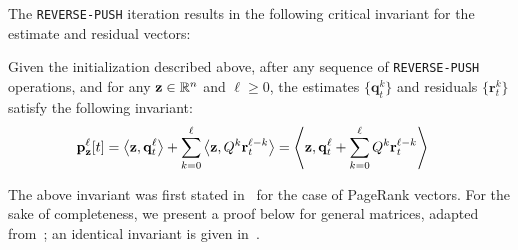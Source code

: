 The \texttt{REVERSE-PUSH} iteration results in the following critical invariant for the estimate and residual vectors:
\begin{lemma}
\label{lem:pushinvariant}
Given the initialization described above, after any sequence of \texttt{REVERSE-PUSH} operations, and for any $\mathbf{z}\in\mathbb{R}^n$ and $\ell\geq 0$, the estimates $\{\mathbf{q}_t^k\}$ and residuals $\{\mathbf{r}_t^k\}$  satisfy the following invariant:
\begin{align*}
\mathbf{p}_{\mathbf{z}}^{\ell}[t] &= \left< \mathbf{z}, \mathbf{q}_t^{\ell} \right> + \sum_{k=0}^{\ell} \left<\mathbf{z}, Q^k\mathbf{r}_t^{\ell-k}\right> = \left< \mathbf{z}, \mathbf{q}_t^{\ell}  + \sum_{k=0}^{\ell} Q^k\mathbf{r}_t^{\ell-k}\right>
\end{align*}
\end{lemma}

The above invariant was first stated in~\cite{andersen2007local} for the case of PageRank vectors. 
For the sake of completeness, we present a proof below for general matrices, adapted from~\cite{Lofgren2014}; an identical invariant is given in~\cite{lee2014asynchronous}.

